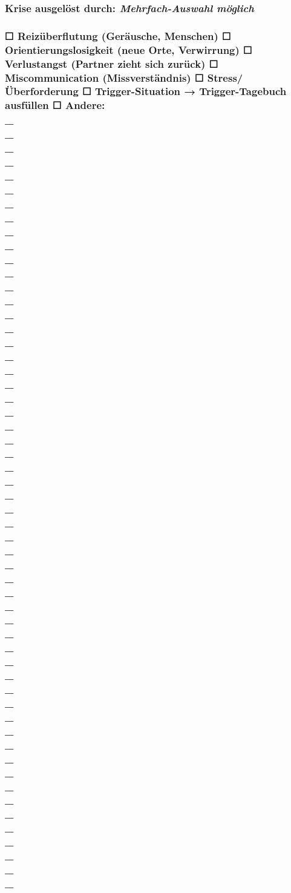 \subsubsection{\textbf{Krise ausgelöst durch:\textit{\textcolor{ctmmYellow}{} Mehrfach-Auswahl möglich}}}

\subsubsection{☐ Reizüberflutung (Geräusche, Menschen) ☐ Orientierungslosigkeit (neue Orte, Verwirrung) ☐ Verlustangst (Partner zieht sich zurück) ☐ Miscommunication (Missverständnis) ☐ Stress/Überforderung ☐ \textcolor{ctmmRed}{Trigger}-Situation → \textbf{\textcolor{ctmmBlue}{} \textcolor{ctmmRed}{Trigger}-Tagebuch ausfüllen} ☐ Andere: \\\_\\\_\\\_\\\_\\\_\\\_\\\_\\\_\\\_\\\_\\\_\\\_\\\_\\\_\\\_\\\_\\\_\\\_\\\_\\\_\\\_\\\_\\\_\\\_\\\_\\\_\\\_\\\_\\\_\\\_\\\_\\\_\\\_\\\_\\\_\\\_\\\_\\\_\\\_\\\_\\\_\\\_\\\_\\\_\\\_\\\_\\\_\\\_\\\_\\\_\\\_\\\_\\\_\\\_\\\_\\\_}


